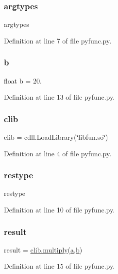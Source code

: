 \subsubsection{\texorpdfstring{argtypes}{argtypes}}
{\footnotesize\ttfamily argtypes}



Definition at line 7 of file pyfunc.\+py.

\mbox{\label{namespacepyfunc_a83fc1af92e29717b4513d121b0c72c7d}} 
\subsubsection{\texorpdfstring{b}{b}}
{\footnotesize\ttfamily float b = 20.}



Definition at line 13 of file pyfunc.\+py.

\mbox{\label{namespacepyfunc_ace4bf3f4d09963496adca6d8952c4d28}} 
\subsubsection{\texorpdfstring{clib}{clib}}
{\footnotesize\ttfamily clib = cdll.\+Load\+Library(\char`\"{}libfun.\+so\char`\"{})}



Definition at line 4 of file pyfunc.\+py.

\mbox{\label{namespacepyfunc_ab2283b4bbda0fbadaf5d9500e886ecbe}} 
\subsubsection{\texorpdfstring{restype}{restype}}
{\footnotesize\ttfamily restype}



Definition at line 10 of file pyfunc.\+py.

\mbox{\label{namespacepyfunc_a937d4dd628a8858b443a399410d2600b}} 
\subsubsection{\texorpdfstring{result}{result}}
{\footnotesize\ttfamily result = \mbox{\hyperlink{cfunc_8c_ac949e69d65ab7d1987f3dd728e6d259a}{clib.\+multiply}}(\mbox{\hyperlink{namespacepyfunc_a4aec1a5be9d9a4a394a2e49e9744286e}{a}},\mbox{\hyperlink{namespacepyfunc_a83fc1af92e29717b4513d121b0c72c7d}{b}})}



Definition at line 15 of file pyfunc.\+py.

